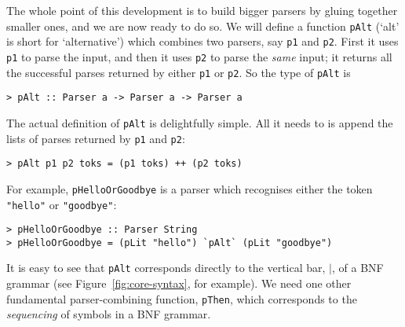 The whole point of this development is to build bigger parsers by gluing
together smaller ones, and we are now ready to do so.  We will define
a function \mbox{\tt pAlt} (`alt' is short for `alternative')
which combines two parsers, say \mbox{\tt p1} and \mbox{\tt p2}.
First it uses \mbox{\tt p1} to parse the input, and then it uses \mbox{\tt p2} to parse the
{\em same\/} input; it returns all the successful parses returned by either
\mbox{\tt p1} or \mbox{\tt p2}.  So the type of \mbox{\tt pAlt} is
\begin{verbatim}
> pAlt :: Parser a -> Parser a -> Parser a
\end{verbatim}
%
\par
The actual definition of \mbox{\tt pAlt} is delightfully simple.  All it needs
to is append the lists of parses returned by \mbox{\tt p1} and \mbox{\tt p2}:
\begin{verbatim}
> pAlt p1 p2 toks = (p1 toks) ++ (p2 toks)
\end{verbatim}
%
For example, \mbox{\tt pHelloOrGoodbye} is a parser which recognises either
the token \mbox{\tt "hello"} or \mbox{\tt "goodbye"}:
\begin{verbatim}
> pHelloOrGoodbye :: Parser String
> pHelloOrGoodbye = (pLit "hello") `pAlt` (pLit "goodbye")
\end{verbatim}
%
%
It is easy to see that \mbox{\tt pAlt} corresponds directly to the
vertical bar,
$|$,
of a BNF grammar (see Figure~\ref{fig:core-syntax}, for example).
We need one other fundamental parser-combining function, \mbox{\tt pThen}, which
corresponds to the {\em sequencing\/} of symbols in a BNF grammar.

